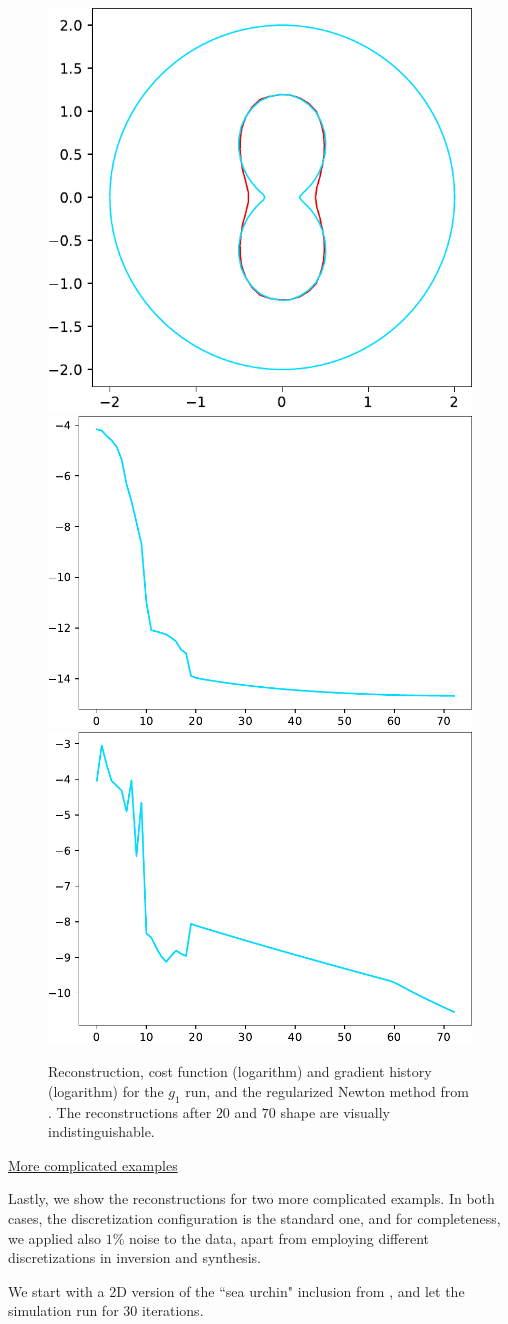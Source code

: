 \documentclass[english,a4paper,10pt,oneside]{scrbook}	%
\theoremstyle{break}
\theoremstyle{remark}
\begin{document}
\begin{figure}[H]
\centering
\includegraphics[height=0.25\columnwidth]{Images/hourglass_constant_newton/comparison.pdf}
\includegraphics[height=0.25\columnwidth]{Images/hourglass_constant_newton/cost_function.pdf}
\includegraphics[height=0.25\columnwidth]{Images/hourglass_constant_newton/gradient_infty_norm.pdf}
\caption{Reconstruction, cost function (logarithm) and gradient history (logarithm) for the $g_1$ run, and the regularized Newton method from \cite{eppler}. The reconstructions after $20$ and $70$ shape are visually indistinguishable.}\label{fig:newton}
\end{figure}

\underline{More complicated examples}

Lastly, we show the reconstructions for two more complicated exampls. In both cases, the discretization configuration is the standard one, and for completeness, we applied also $1$\% noise to the data, apart from employing different discretizations in inversion and synthesis.

We start with a 2D version of the ``sea urchin" inclusion from \cite{harbrecht}, and let the simulation run for $30$ iterations. 
\end{document}
